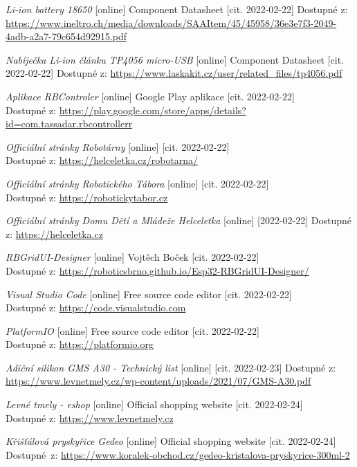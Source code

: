 \begin{thebibliography}{99}
\textit{Li-ion battery 18650} [online] Component Datasheet [cit. 2022-02-22] Dostupné z: \url{https://www.ineltro.ch/media/downloads/SAAItem/45/45958/36e3e7f3-2049-4adb-a2a7-79c654d92915.pdf}

\textit{Nabíječka Li-ion článku TP4056 micro-USB} [online] Component Datasheet [cit. 2022-02-22] Dostupné z: \url{https://www.laskakit.cz/user/related_files/tp4056.pdf}

\textit{Aplikace RBControler} [online] Google Play aplikace [cit. 2022-02-22] \\
Dostupné z: \url{https://play.google.com/store/apps/details?id=com.tassadar.rbcontrollerr}

\textit {Officiální stránky Robotárny} [online] [cit. 2022-02-22] \\
Dostupné z: \url{https://helceletka.cz/robotarna/}

\textit {Officiální stránky Robotického Tábora} [online] [cit. 2022-02-22] \\
Dostupné z: \url{https://robotickytabor.cz}

\textit {Officiální stránky Domu Dětí a Mládeže Helceletka} [online] [2022-02-22] 
Dostupné z: \url{https://helceletka.cz}

\textit{RBGridUI-Designer} [online] Vojtěch Boček [cit. 2022-02-22] \\
Dostupné z: \url{https://roboticsbrno.github.io/Esp32-RBGridUI-Designer/} 

\textit{Visual Studio Code} [online] Free source code editor [cit. 2022-02-22] \\
Dostupné z: \url{https://code.visualstudio.com} 

\textit{PlatformIO} [online] Free source code editor [cit. 2022-02-22] \\
Dostupné z: \url{https://platformio.org} 

\textit{Adiční silikon GMS A30 - Technický list} [online] [cit. 2022-02-23] 
Dostupné z: \url{https://www.levnetmely.cz/wp-content/uploads/2021/07/GMS-A30.pdf} 

\textit{Levné tmely - eshop} [online] Official shopping website [cit. 2022-02-24] \\
Dostupné z: \url{https://www.levnetmely.cz} 

\textit{Křišťálová pryskyřice Gedeo} [online] Official shopping website [cit. 2022-02-24] \\
Dostupné~z: \url{https://www.koralek-obchod.cz/gedeo-kristalova-pryskyrice-300ml-2} 


\end{thebibliography}
